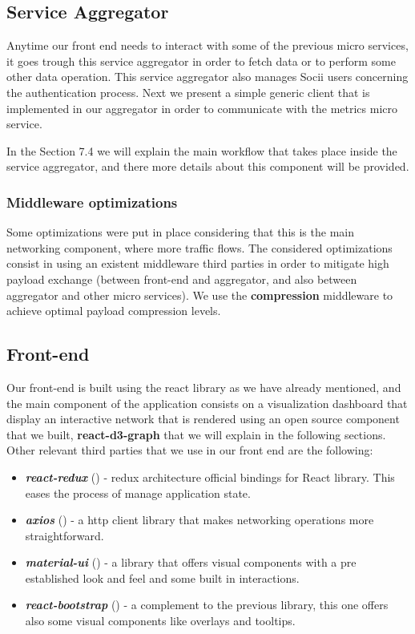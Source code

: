 

\subsection{Service Aggregator}
Anytime our front end needs to interact with some of the previous micro services, it goes trough this service aggregator
in order to fetch data or to perform some other data operation. This service aggregator also manages Socii users concerning the authentication process.
Next we present a simple generic client that is implemented in our aggregator in order to communicate with the metrics micro service.



In the Section 7.4 we will explain the main workflow that takes place inside the service aggregator, and there more details about this component will be provided.

\subsubsection{Middleware optimizations}
Some optimizations were put in place considering that this is the main networking component, where more traffic flows. The considered optimizations consist in using an existent middleware third parties in order to mitigate high payload exchange (between front-end and aggregator, and also between aggregator and other micro services). We use the \textbf{compression} \cite{compression} middleware to achieve optimal payload compression levels.

\subsection{Front-end}

Our front-end is built using the react library as we have already mentioned, and the main component of the application consists on a visualization dashboard that display an interactive network that is rendered using an open source component that we built, \textbf{react-d3-graph} \cite{reactd3graph} that we will explain in the following sections. Other relevant third parties that we use in our front end are the following:

\begin{itemize}
    \item \textit{\textbf{react-redux}} (\cite{reactredux}) - redux architecture official bindings for React library. This eases the process of manage application state.
    \item \textit{\textbf{axios}} (\cite{axios}) - a http client library that makes networking operations more straightforward.
    \item \textit{\textbf{material-ui}} (\cite{materialui}) - a library that offers visual components with a pre established look and feel and some built in interactions.
    \item \textit{\textbf{react-bootstrap}} (\cite{reactbootstrap}) - a complement to the previous library, this one offers also some visual components like overlays and tooltips.
\end{itemize}

